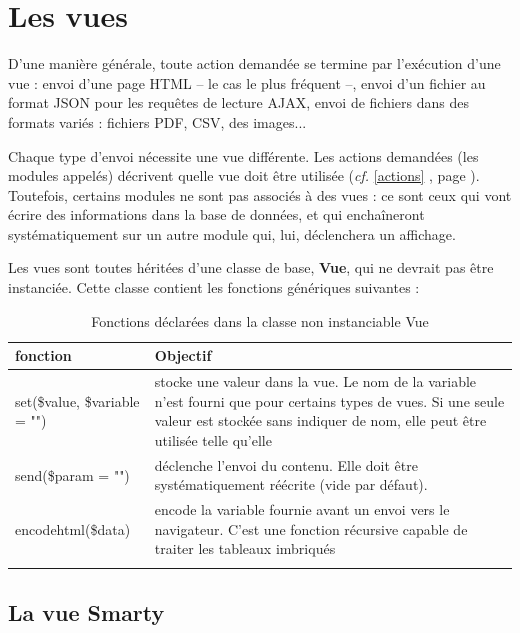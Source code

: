 \chapter{Les vues}\label{vue}

D'une manière générale, toute action demandée se termine par l'exécution d'une vue : envoi d'une page HTML -- le cas le plus fréquent --, envoi d'un fichier au format JSON pour les requêtes de lecture AJAX, envoi de fichiers dans des formats variés : fichiers PDF, CSV, des images...

Chaque type d'envoi nécessite une vue différente. Les actions demandées (les modules appelés) décrivent quelle vue doit être utilisée (\textit{cf.} \ref{actions} \textit{}, page \pageref{actions}). Toutefois, certains modules ne sont pas associés à des vues : ce sont ceux qui vont écrire des informations dans la base de données, et qui enchaîneront systématiquement sur un autre module qui, lui, déclenchera un affichage.

Les vues sont toutes héritées d'une classe de base, \textbf{Vue}, qui ne devrait pas être instanciée. Cette classe contient les fonctions génériques suivantes :

\begin{longtable}{|p{5cm}|p{8cm}|}
\hline
\textbf{fonction} & \textbf{Objectif} \\
\hline
\endhead
\hline\endfoot\endlastfoot

set(\$value, \$variable = "") & stocke une valeur dans la vue. Le nom de la variable n'est fourni que pour certains types de vues. Si une seule valeur est stockée sans indiquer de nom, elle peut être utilisée telle qu'elle \\

send(\$param = "") & déclenche l'envoi du contenu. Elle doit être systématiquement réécrite (vide par défaut). \\

encodehtml(\$data) & encode la variable fournie avant un envoi vers le navigateur. C'est une fonction récursive capable de traiter les tableaux imbriqués \\
\hline

\caption{Fonctions déclarées dans la classe non instanciable Vue}
\end{longtable}

\section{La vue Smarty}

